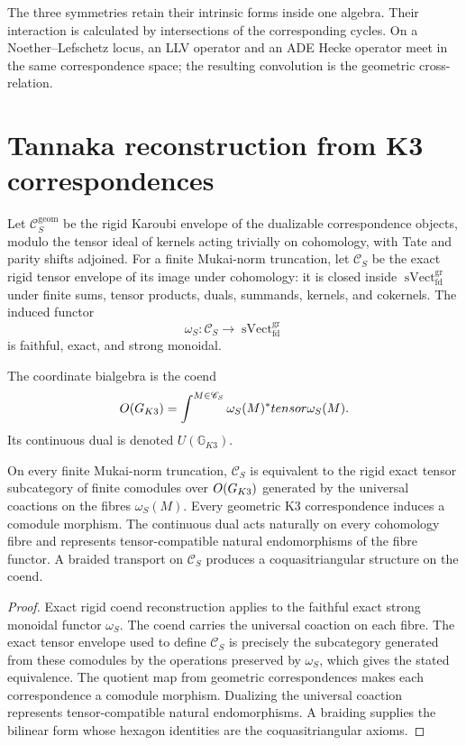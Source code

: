 The three symmetries retain their intrinsic forms inside one algebra.  Their interaction is calculated by intersections of the corresponding cycles.  On a Noether--Lefschetz locus, an LLV operator and an ADE Hecke operator meet in the same correspondence space; the resulting convolution is the geometric cross-relation.

\chapter{Tannaka reconstruction from K3 correspondences}
Let $\mathscr C_S^{\mathrm{geom}}$ be the rigid Karoubi envelope of the dualizable correspondence objects, modulo the tensor ideal of kernels acting trivially on cohomology, with Tate and parity shifts adjoined.  For a finite Mukai-norm truncation, let $\mathscr C_S$ be the exact rigid tensor envelope of its image under cohomology: it is closed inside $\operatorname{sVect}^{\mathrm{gr}}_{\mathrm{fd}}$ under finite sums, tensor products, duals, summands, kernels, and cokernels.  The induced functor
\[
 \omega_S:\mathscr C_S\longrightarrow\operatorname{sVect}^{\mathrm{gr}}_{\mathrm{fd}}
\]
is faithful, exact, and strong monoidal.

\begin{definition}
The coordinate bialgebra is the coend
\[
 O(G_{K3})
 =\int^{M\in\mathscr C_S}\omega_S(M)^*tensor\omega_S(M).
\]
Its continuous dual is denoted $U(\mathbb G_{K3})$.
\end{definition}

\begin{theorem}
On every finite Mukai-norm truncation, $\mathscr C_S$ is equivalent to the rigid exact tensor subcategory of finite comodules over $O(G_{K3})$ generated by the universal coactions on the fibres $\omega_S(M)$.  Every geometric K3 correspondence induces a comodule morphism.  The continuous dual acts naturally on every cohomology fibre and represents tensor-compatible natural endomorphisms of the fibre functor.  A braided transport on $\mathscr C_S$ produces a coquasitriangular structure on the coend.
\end{theorem}
\begin{proof}
Exact rigid coend reconstruction applies to the faithful exact strong monoidal functor $\omega_S$.  The coend carries the universal coaction on each fibre.  The exact tensor envelope used to define $\mathscr C_S$ is precisely the subcategory generated from these comodules by the operations preserved by $\omega_S$, which gives the stated equivalence.  The quotient map from geometric correspondences makes each correspondence a comodule morphism.  Dualizing the universal coaction represents tensor-compatible natural endomorphisms.  A braiding supplies the bilinear form whose hexagon identities are the coquasitriangular axioms.
\end{proof}


